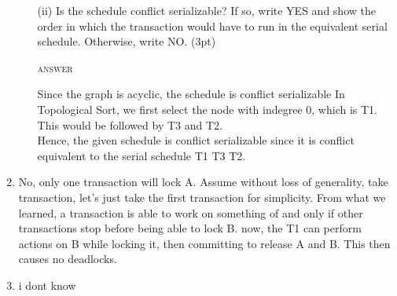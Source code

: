 \documentclass[a4paper, 11pt]{article}
\begin{document}
\begin{enumerate}
\begin{itemize}
	\item[(ii)] Is the schedule conflict serializable? If so, write YES and show the order in which the transaction would have to run in the equivalent serial schedule. Otherwise, write NO. (3pt)
	
	\textsc{answer}
	
	Since the graph is acyclic, the schedule is conflict serializable
	In Topological Sort, we first select the node with indegree 0, which is T1. This would be followed by T3 and T2. \\
	 Hence, the given schedule is conflict serializable since it is conflict equivalent to the serial schedule T1 T3 T2.
\end{itemize}	 
	\item No, only one transaction will lock A.
	Assume without loss of generality, take transaction, let's just take the first transaction for simplicity. From what we learned,  a  transaction is able to work on something of and only if other transactions stop before being able to lock B. now, the T1 can perform actions on B while locking it, then committing  to release A and B. This then causes no deadlocks.  
	\item i dont know
\end{enumerate}
\end{document}
